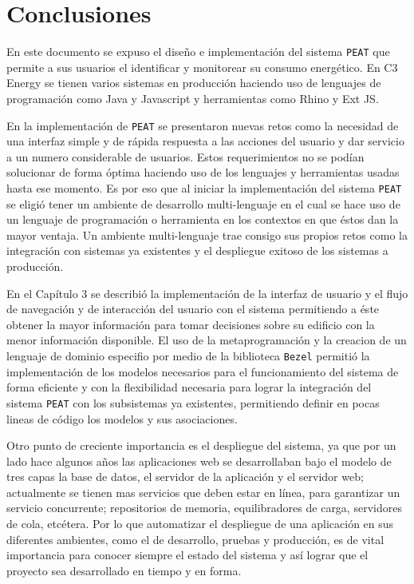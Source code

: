 \chapter{Conclusiones}

En este documento se expuso el diseño e implementación del sistema \texttt{PEAT} que
permite a sus usuarios el identificar y monitorear su consumo energético. En C3
Energy se tienen varios sistemas en producción haciendo uso de lenguajes de
programación como Java y Javascript y herramientas como Rhino y Ext JS.

En la implementación de \texttt{PEAT} se presentaron nuevas retos como la necesidad
de una interfaz simple y de rápida respuesta a las acciones del usuario y
dar servicio a un numero considerable de usuarios.
Estos requerimientos no se podían solucionar de forma óptima haciendo uso de los
lenguajes y herramientas usadas hasta ese momento. Es por eso que al iniciar
la implementación del sistema \texttt{PEAT} se eligió tener un ambiente de
desarrollo multi-lenguaje en el cual se hace uso de un lenguaje de programación
o herramienta en los contextos en que éstos dan la mayor ventaja. Un ambiente
multi-lenguaje trae consigo sus propios retos como la integración con sistemas ya
existentes y el despliegue exitoso de los sistemas a producción.

En el Capítulo 3 se describió la implementación de la interfaz de usuario y el flujo
de navegación y de interacción del usuario con el sistema permitiendo a éste obtener
la mayor información para tomar decisiones sobre su edificio con la menor información
disponible. El uso de la metaprogramación y la creacion de un lenguaje de
dominio especifio por medio de la biblioteca \texttt{Bezel} permitió la
implementación de los modelos necesarios para el funcionamiento del sistema
de forma eficiente y con la flexibilidad necesaria para lograr la integración
del sistema \texttt{PEAT} con los subsistemas ya existentes, permitiendo
definir en pocas lineas de código los modelos y sus asociaciones.

Otro punto de creciente importancia es el despliegue del sistema, ya que por
un lado hace algunos años las aplicaciones web se desarrollaban bajo el modelo
de tres capas la base de datos, el servidor de la aplicación y el servidor web;
actualmente se tienen mas servicios que deben estar en línea, para garantizar un
servicio concurrente; repositorios de memoria, equilibradores de carga, servidores
de cola, etcétera. Por lo que automatizar el despliegue de una aplicación en sus
diferentes ambientes, como el de desarrollo, pruebas y producción, es de vital
importancia para conocer siempre el estado del sistema y así lograr que el proyecto
sea desarrollado en tiempo y en forma.

